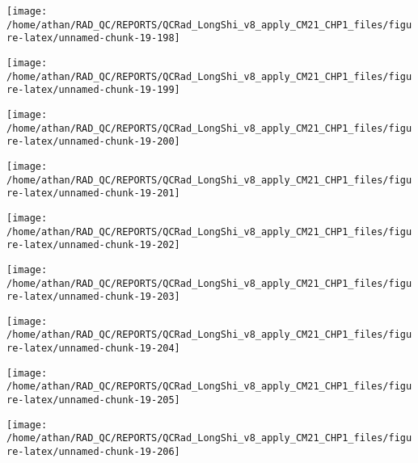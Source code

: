 \documentclass[
  10pt,
  a4paper,oneside]{article}
\begin{document}
\begin{center}\texttt{[image: /home/athan/RAD\_QC/REPORTS/QCRad\_LongShi\_v8\_apply\_CM21\_CHP1\_files/figure-latex/unnamed-chunk-19-198]} \end{center}

\begin{center}\texttt{[image: /home/athan/RAD\_QC/REPORTS/QCRad\_LongShi\_v8\_apply\_CM21\_CHP1\_files/figure-latex/unnamed-chunk-19-199]} \end{center}

\begin{center}\texttt{[image: /home/athan/RAD\_QC/REPORTS/QCRad\_LongShi\_v8\_apply\_CM21\_CHP1\_files/figure-latex/unnamed-chunk-19-200]} \end{center}

\begin{center}\texttt{[image: /home/athan/RAD\_QC/REPORTS/QCRad\_LongShi\_v8\_apply\_CM21\_CHP1\_files/figure-latex/unnamed-chunk-19-201]} \end{center}

\begin{center}\texttt{[image: /home/athan/RAD\_QC/REPORTS/QCRad\_LongShi\_v8\_apply\_CM21\_CHP1\_files/figure-latex/unnamed-chunk-19-202]} \end{center}

\begin{center}\texttt{[image: /home/athan/RAD\_QC/REPORTS/QCRad\_LongShi\_v8\_apply\_CM21\_CHP1\_files/figure-latex/unnamed-chunk-19-203]} \end{center}

\begin{center}\texttt{[image: /home/athan/RAD\_QC/REPORTS/QCRad\_LongShi\_v8\_apply\_CM21\_CHP1\_files/figure-latex/unnamed-chunk-19-204]} \end{center}

\begin{center}\texttt{[image: /home/athan/RAD\_QC/REPORTS/QCRad\_LongShi\_v8\_apply\_CM21\_CHP1\_files/figure-latex/unnamed-chunk-19-205]} \end{center}

\begin{center}\texttt{[image: /home/athan/RAD\_QC/REPORTS/QCRad\_LongShi\_v8\_apply\_CM21\_CHP1\_files/figure-latex/unnamed-chunk-19-206]} \end{center}
\end{document}
